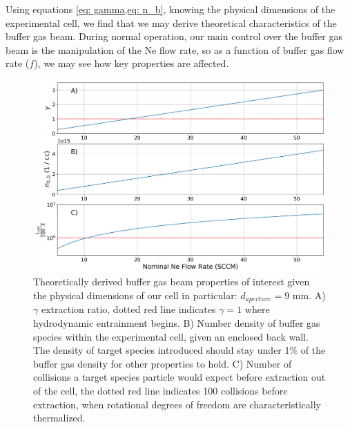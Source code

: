 Using equations \cref{eq: gamma,eq: n_b}, knowing the physical dimensions of the experimental cell, we find that we may derive theoretical characteristics of the buffer gas beam. During normal operation, our main control over the buffer gas beam is the manipulation of the Ne flow rate, so as a function of buffer gas flow rate ($f$), we may see how key properties are affected.

\begin{figure}[H]
	\centering
	\includegraphics[width=1\textwidth]{images/CBGB_flow_characteristics.png}
	\caption{Theoretically derived buffer gas beam properties of interest given the physical dimensions of our cell in particular: $d_{aperture} = 9$ mm. A) $\gamma$ extraction ratio, dotted red line indicates $\gamma = 1$ where hydrodynamic entrainment begins. B) Number density of buffer gas species within the experimental cell, given an enclosed back wall. The density of target species introduced should stay under 1\% of the buffer gas density for other properties to hold. C) Number of collisions a target species particle would expect before extraction out of the cell, the dotted red line indicates 100 collisions before extraction, when rotational degrees of freedom are characteristically thermalized.}
	\label{fig: buffer_gas_flow}
\end{figure}